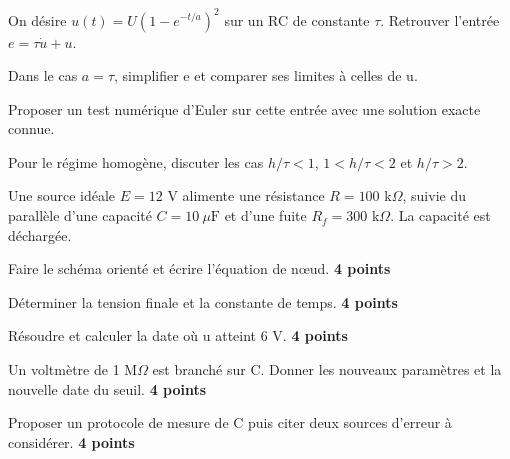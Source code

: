 \label{ch03-ex-D3}
\begin{questions}
\item On désire $u(t)=U(1-e^{-t/a})^2$ sur un RC de constante $\tau$. Retrouver l’entrée $e=\tau\dot u+u$.
\item Dans le cas $a=\tau$, simplifier e et comparer ses limites à celles de u.
\item Proposer un test numérique d’Euler sur cette entrée avec une solution exacte connue.
\item Pour le régime homogène, discuter les cas $h/\tau<1$, $1<h/\tau<2$ et $h/\tau>2$.
\end{questions}


Une source idéale $E=12$ V alimente une résistance $R=100$ k$\Omega$, suivie du parallèle d’une capacité $C=10\ \mu\mathrm{ F}$ et d’une fuite $R_f=300$ k$\Omega$. La capacité est déchargée.\begin{questions}
\item Faire le schéma orienté et écrire l’équation de nœud. \textbf{4 points}
\item Déterminer la tension finale et la constante de temps. \textbf{4 points}
\item Résoudre et calculer la date où u atteint 6 V. \textbf{4 points}
\item Un voltmètre de 1 M$\Omega$ est branché sur C. Donner les nouveaux paramètres et la nouvelle date du seuil. \textbf{4 points}
\item Proposer un protocole de mesure de C puis citer deux sources d’erreur à considérer. \textbf{4 points}
\end{questions}


